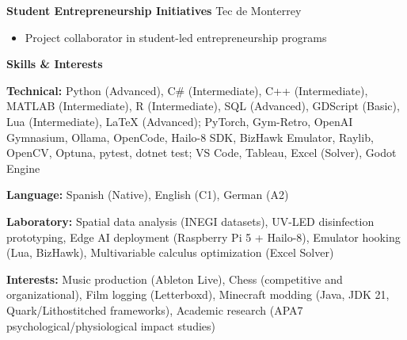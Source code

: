\documentclass[11pt]{article}
\begin{document}
\vspace{6pt}

\textbf{Student Entrepreneurship Initiatives} \hfill Tec de Monterrey
\begin{itemize}[noitemsep, topsep=0pt, partopsep=0pt, parsep=0pt]
    \item Project collaborator in student-led entrepreneurship programs
\end{itemize}

\vspace{12pt}

\begin{center}
    \textbf{Skills \& Interests}
\end{center}

\textbf{Technical:} Python (Advanced), C\# (Intermediate), C++ (Intermediate), MATLAB (Intermediate), R (Intermediate), SQL (Advanced), GDScript (Basic), Lua (Intermediate), LaTeX (Advanced); PyTorch, Gym-Retro, OpenAI Gymnasium, Ollama, OpenCode, Hailo-8 SDK, BizHawk Emulator, Raylib, OpenCV, Optuna, pytest, dotnet test; VS Code, Tableau, Excel (Solver), Godot Engine

\textbf{Language:} Spanish (Native), English (C1), German (A2)

\textbf{Laboratory:} Spatial data analysis (INEGI datasets), UV-LED disinfection prototyping, Edge AI deployment (Raspberry Pi 5 + Hailo-8), Emulator hooking (Lua, BizHawk), Multivariable calculus optimization (Excel Solver)

\textbf{Interests:} Music production (Ableton Live), Chess (competitive and organizational), Film logging (Letterboxd), Minecraft modding (Java, JDK 21, Quark/Lithostitched frameworks), Academic research (APA7 psychological/physiological impact studies)
\end{document}
